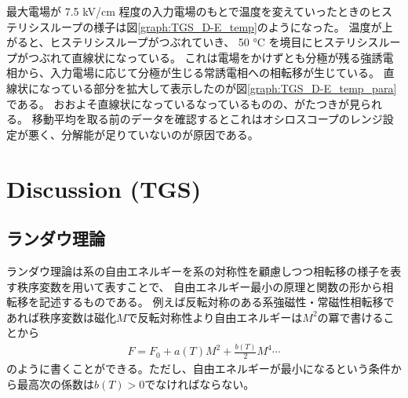\documentclass[11pt,dvipdfmx,a4paper]{jsarticle}
\begin{document}
最大電場が 7.5 kV/cm 程度の入力電場のもとで温度を変えていったときのヒステリシスループの様子は図\ref{graph:TGS_D-E_temp}のようになった。
温度が上がると、ヒステリシスループがつぶれていき、
50 \si{\degreeCelsius} を境目にヒステリシスループがつぶれて直線状になっている。
これは電場をかけずとも分極が残る強誘電相から、入力電場に応じて分極が生じる常誘電相への相転移が生じている。
直線状になっている部分を拡大して表示したのが図\ref{graph:TGS_D-E_temp_para}である。
おおよそ直線状になっているなっているものの、がたつきが見られる。
移動平均を取る前のデータを確認するとこれはオシロスコープのレンジ設定が悪く、分解能が足りていないのが原因である。

\section{Discussion (TGS)}
\subsection{ランダウ理論}
ランダウ理論は系の自由エネルギーを系の対称性を顧慮しつつ相転移の様子を表す秩序変数を用いて表すことで、
自由エネルギー最小の原理と関数の形から相転移を記述するものである。
例えば反転対称のある系強磁性・常磁性相転移であれば秩序変数は磁化\(M\)で反転対称性より自由エネルギーは\(M^2\)の冪で書けることから
\begin{align}
    F = F_0 + a(T)M^2 + \frac{b(T)}{2}M^4 \cdots
\end{align}
のように書くことができる。ただし、自由エネルギーが最小になるという条件から最高次の係数は\(b(T)>0\)でなければならない。
\end{document}
